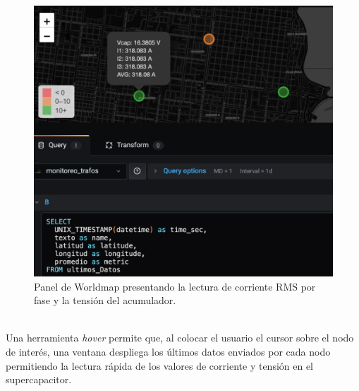 \begin{figure}[h]
	\centering
	\includegraphics[width=0.9\linewidth]{Figures/worldmap_panel}
	\caption{Panel de Worldmap presentando la lectura de corriente RMS por fase y la tensión del acumulador.}
	\label{fig:worldmappanel}
\end{figure}\\
Una herramienta \textit{hover} permite que, al colocar el usuario el cursor sobre el nodo de inter\'{e}s, una ventana despliega los últimos datos enviados por cada nodo permitiendo la lectura r\'{a}pida de los valores de corriente y tensión en el supercapacitor.